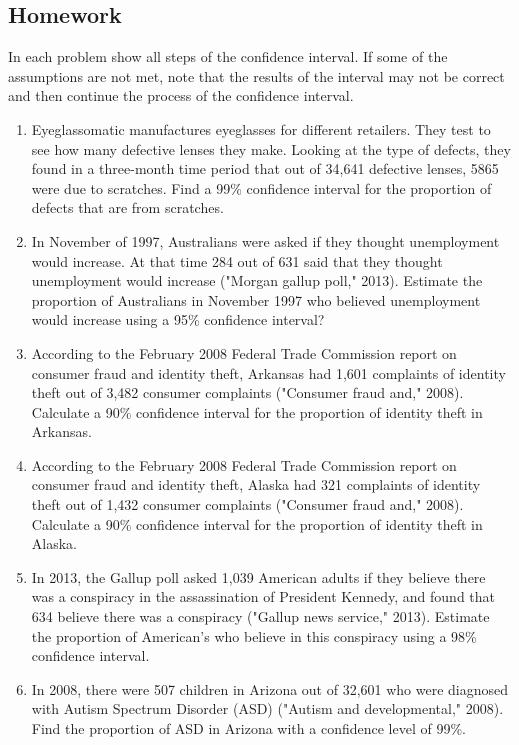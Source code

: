\documentclass[]{book}
\begin{document}
\hypertarget{homework-24}{%
\subsection{Homework}\label{homework-24}}

In each problem show all steps of the confidence interval. If some of the assumptions are not met, note that the results of the interval may not be correct and then continue the process of the confidence interval.

\begin{enumerate}
\def\labelenumi{\arabic{enumi}.}
\item
  Eyeglassomatic manufactures eyeglasses for different retailers. They test to see how many defective lenses they make. Looking at the type of defects, they found in a three-month time period that out of 34,641 defective lenses, 5865 were due to scratches. Find a 99\% confidence interval for the proportion of defects that are from scratches.
\item
  In November of 1997, Australians were asked if they thought unemployment would increase. At that time 284 out of 631 said that they thought unemployment would increase ("Morgan gallup poll," 2013). Estimate the proportion of Australians in November 1997 who believed unemployment would increase using a 95\% confidence interval?
\item
  According to the February 2008 Federal Trade Commission report on consumer fraud and identity theft, Arkansas had 1,601 complaints of identity theft out of 3,482 consumer complaints ("Consumer fraud and," 2008). Calculate a 90\% confidence interval for the proportion of identity theft in Arkansas.
\item
  According to the February 2008 Federal Trade Commission report on consumer fraud and identity theft, Alaska had 321 complaints of identity theft out of 1,432 consumer complaints ("Consumer fraud and," 2008). Calculate a 90\% confidence interval for the proportion of identity theft in Alaska.
\item
  In 2013, the Gallup poll asked 1,039 American adults if they believe there was a conspiracy in the assassination of President Kennedy, and found that 634 believe there was a conspiracy ("Gallup news service," 2013). Estimate the proportion of American's who believe in this conspiracy using a 98\% confidence interval.
\item
  In 2008, there were 507 children in Arizona out of 32,601 who were diagnosed with Autism Spectrum Disorder (ASD) ("Autism and developmental," 2008). Find the proportion of ASD in Arizona with a confidence level of 99\%.
\end{enumerate}
\end{document}
